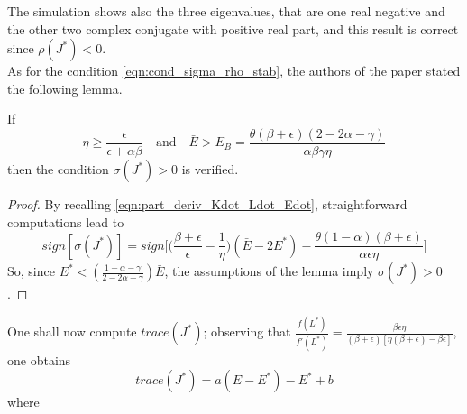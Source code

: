 The simulation shows also the three eigenvalues, that are one real negative and the other two complex conjugate with positive real part, and this result is correct since $\rho(J^*)<0$.\\
As for the condition \eqref{eqn:cond_sigma_rho_stab}, the authors of the paper stated the following lemma.
\begin{lemma} \label{lemma:3_condition_for_simga_pos}
	If 
	\begin{equation} \label{eqn:lemma_3}
		\eta\geq \frac{\epsilon}{\epsilon+\alpha\beta} \quad \text{and} \quad \bar{E}>E_B=\frac{\theta(\beta+\epsilon)(2-2\alpha-\gamma)}{\alpha\beta\gamma\eta}
	\end{equation}
	then the condition $\sigma(J^*)>0$ is verified.
\end{lemma}
\begin{proof}
	By recalling \eqref{eqn:part_deriv_Kdot_Ldot_Edot}, straightforward computations lead to 
	$$ sign[\sigma(J^*)] = sign\Bigg[\Bigg(\frac{\beta+\epsilon}{\epsilon}-\frac{1}{\eta}\Bigg)(\bar{E}-2E^*)-\frac{\theta(1-\alpha)(\beta+\epsilon)}{\alpha\epsilon\eta}\Bigg] $$
	So, since $E^*<(\frac{1-\alpha-\gamma}{2-2\alpha-\gamma})\bar{E}$, the assumptions of the lemma imply $\sigma(J^*)>0$.
\end{proof}
One shall now compute $trace(J^*)$; observing that $\frac{f(L^*)}{f'(L^*)}=\frac{\beta\epsilon\eta}{(\beta+\epsilon)[\eta(\beta+\epsilon)-\beta\epsilon]}$, one obtains $$trace(J^*)=a(\bar{E}-E^*)-E^*+b$$ where 


